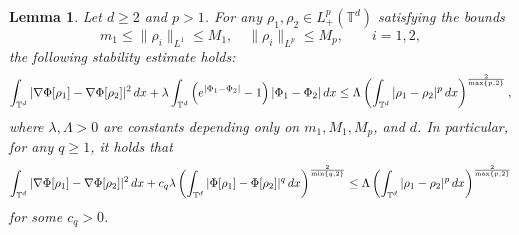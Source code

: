 \documentclass[11pt,reqno,a4paper]{amsart}
\newcommand{\intt}{\int_{\T^d}}
\newtheorem{lemma}{Lemma}[section]
\theoremstyle{definition}
\theoremstyle{remark}
\numberwithin{equation}{section}
\newcommand{\T} {\mathbb T}
\newcommand{\lt}{\left}
\newcommand{\rt}{\right}
\newcommand{\bq}{\begin{equation}}
\newcommand{\eq}{\end{equation}}
\newcommand{\dx}{\textnormal{d}x}
\begin{document}
\begin{lemma}
\label{lem:sst}
Let $d\ge2$ and $p>1$. For any $\rho_1, \rho_2\in L^p_+(\T^d)$ satisfying the bounds
\bq\label{eq:home}
m_1 \le \| \rho_i\|_{L^1} \le M_1, \quad \| \rho_i\|_{L^p} \le M_p,  \qquad i=1,2,
\eq
the following stability estimate holds:
\[
\intt |\nabla\Phi[\rho_1] - \nabla\Phi[\rho_2]|^2 \,\dx + \lambda \intt \lt(e^{|\Phi_1 -\Phi_2|}-1\rt)|\Phi_1 -\Phi_2| \,\dx \le \Lambda  \lt(\intt |\rho_1 - \rho_2|^p \,\dx\rt)^{\frac{2}{\max\{p,2\}}},  
\]
where $\lambda, \Lambda >0$ are constants depending only on $m_1,M_1,M_p$, and $d$. In particular, for any $q\ge 1$, it holds that
\begin{equation*}
\intt |\nabla\Phi[\rho_1] - \nabla\Phi[\rho_2]|^2 \,\dx + c_q{\lambda}  \lt(\intt |\Phi[\rho_1] - \Phi[\rho_2]|^{q} \,\dx\rt)^{\frac{2}{\min\{q,2\}}}  \le \Lambda \lt(\intt |\rho_1 - \rho_2|^p \,\dx\rt)^{\frac{2}{\max\{p,2\}}}  
\end{equation*}
for some $c_q>0$. 
\end{lemma}
\end{document}

